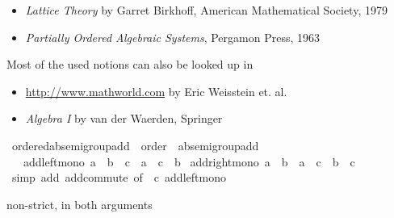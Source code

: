 \begin{isabellebody}
\begin{isamarkuptext}
%
\begin{itemize}%
\item \emph{Lattice Theory} by Garret Birkhoff, American Mathematical Society, 1979

\item \emph{Partially Ordered Algebraic Systems}, Pergamon Press, 1963%
\end{itemize}

Most of the used notions can also be looked up in

%
\begin{itemize}%
\item \url{http://www.mathworld.com} by Eric Weisstein et. al.

\item \emph{Algebra I} by van der Waerden, Springer%
\end{itemize}%
\end{isamarkuptext}\isamarkuptrue%
\isamarkupfalse%
\ ordered{\isacharunderscore}{\kern0pt}ab{\isacharunderscore}{\kern0pt}semigroup{\isacharunderscore}{\kern0pt}add\ {\isacharequal}{\kern0pt}\ order\ {\isacharplus}{\kern0pt}\ ab{\isacharunderscore}{\kern0pt}semigroup{\isacharunderscore}{\kern0pt}add\ {\isacharplus}{\kern0pt}\isanewline
\ \ \ add{\isacharunderscore}{\kern0pt}left{\isacharunderscore}{\kern0pt}mono{\isacharcolon}{\kern0pt}\ {\isachardoublequoteopen}a\ {\isasymle}\ b\ {\isasymLongrightarrow}\ c\ {\isacharplus}{\kern0pt}\ a\ {\isasymle}\ c\ {\isacharplus}{\kern0pt}\ b{\isachardoublequoteclose}\isanewline
{}\isanewline
\isanewline
{}\isamarkupfalse%
\ add{\isacharunderscore}{\kern0pt}right{\isacharunderscore}{\kern0pt}mono{\isacharcolon}{\kern0pt}\ {\isachardoublequoteopen}a\ {\isasymle}\ b\ {\isasymLongrightarrow}\ a\ {\isacharplus}{\kern0pt}\ c\ {\isasymle}\ b\ {\isacharplus}{\kern0pt}\ c{\isachardoublequoteclose}\isanewline
%
\isadelimproof
\ \ %
\endisadelimproof
%
\isatagproof
{}\isamarkupfalse%
\ {\isacharparenleft}{\kern0pt}simp\ add{\isacharcolon}{\kern0pt}\ add{\isachardot}{\kern0pt}commute\ {\isacharbrackleft}{\kern0pt}of\ {\isacharunderscore}{\kern0pt}\ c{\isacharbrackright}{\kern0pt}\ add{\isacharunderscore}{\kern0pt}left{\isacharunderscore}{\kern0pt}mono{\isacharparenright}{\kern0pt}%
\endisatagproof
{\isafoldproof}%
%
\isadelimproof
%
\endisadelimproof
%
\begin{isamarkuptext}%
non-strict, in both arguments%
\end{isamarkuptext}\isamarkuptrue%
\isamarkupfalse%

\end{isabellebody}
